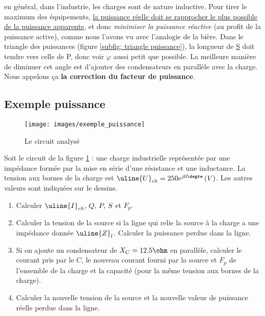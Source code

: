 \documentclass[12pt,a4paper]{article}
\newcommand{\uz}{\uline{Z} }
\newcommand{\ui}{\uline{I} }
\newcommand{\uu}{\uline{U} }
\newcommand{\us}{\uline{S} }
\begin{document}
 en général, dans l'industrie, les charges sont de nature inductive. Pour tirer le maximum des équipements, \uline{la puissance réelle doit se rapprocher le plus possible de la puissance apparente}, et donc \textit{minimiser la puissance réactive} (au profit de la puissance active), comme nous l'avons vu avec l'analogie de la bière. Dans le triangle des puissances (figure \ref{subfig: triangle puissance}), la longueur de \us doit tendre vers celle de P, donc voir $\varphi$ aussi petit que possible. La meilleure manière de diminuer cet angle est d'ajouter des condensateurs en parallèle avec la charge. Nous appelons ça \textbf{la correction du facteur de puissance}.
\subsection{Exemple puissance}
\begin{figure}
	\centering
	\texttt{[image: images/exemple\_puissance]}
	\caption{Le circuit analysé}
	\label{fig: exemple puissance}
\end{figure}
Soit le circuit de la figure \ref{fig: exemple puissance} : une charge industrielle représentée par une impédance formée par la mise en série d'une résistance et une inductance. La tension aux bornes de la charge est $\uu_{ch} = 250e^{j0\degre}\, (V)$. Les autres valeurs sont indiquées sur le dessins. 
\begin{enumerate}[label=\alph*)]
	\item	Calculer $\ui_{ch},\, Q,\, P,\, S$ et $F_p$.
	\item 	Calculer la tension de la source si la ligne qui relie la source à la charge a une impédance donnée $\uz_l$. Calculer la puissance perdue dans la ligne.
	\item	Si on ajoute un condensateur de $X_C = 12.5 \ohm$ en parallèle, calculer le courant pris par le $C$, le nouveau courant fourni par la source et $F_p$ de l'ensemble de la charge et la capacité (pour la même tension aux bornes de la charge).
	\item 	Calculer la nouvelle tension de la source et la nouvelle valeur de puissance réelle perdue dans la ligne.
\end{enumerate}
\end{document}
